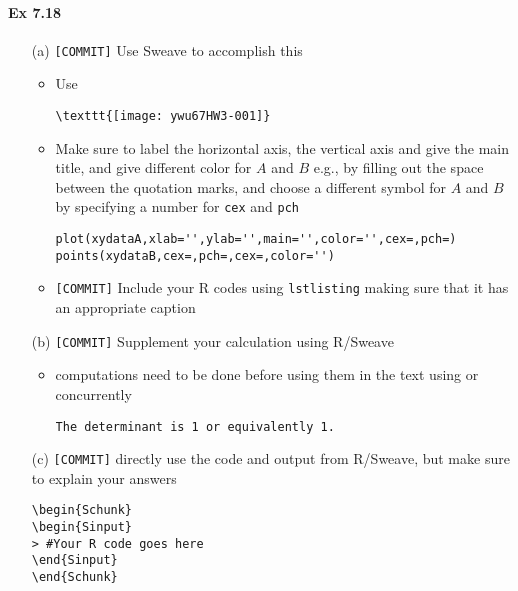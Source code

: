 \documentclass[12pt]{article}
\begin{document}
\paragraph{Ex 7.18}
\begin{itemize}
    \item[(a)] \verb+[COMMIT]+ Use Sweave to accomplish this
        \begin{itemize}
            \item Use 
\begin{lstlisting}
\texttt{[image: ywu67HW3-001]}
\end{lstlisting}
            \item Make sure to label the horizontal axis, the vertical axis
                and give the main title, and give different color for $A$ and
                $B$ e.g., by filling out the space
                between the quotation marks, and choose a different symbol for
                $A$ and $B$ by specifying a number for \verb+cex+ and
                \verb+pch+
\begin{lstlisting}
plot(xydataA,xlab='',ylab='',main='',color='',cex=,pch=)
points(xydataB,cex=,pch=,cex=,color='')
\end{lstlisting}
            \item \verb+[COMMIT]+  Include your R codes using \verb+lstlisting+ making sure that it has an appropriate caption
        \end{itemize}
    \item[(b)] \verb+[COMMIT]+  Supplement your calculation using R/Sweave
        \begin{itemize}
            \item computations need to be done before using them in the text
                using \verb++ or concurrently
\begin{lstlisting}
The determinant is 1 or equivalently 1.
\end{lstlisting}
        \end{itemize}
    \item[(c)] \verb+[COMMIT]+   directly use the code and output from R/Sweave, but make sure
        to explain your answers
\begin{lstlisting}
\begin{Schunk}
\begin{Sinput}
> #Your R code goes here
\end{Sinput}
\end{Schunk}
\end{lstlisting}
\end{itemize}
\end{document}
